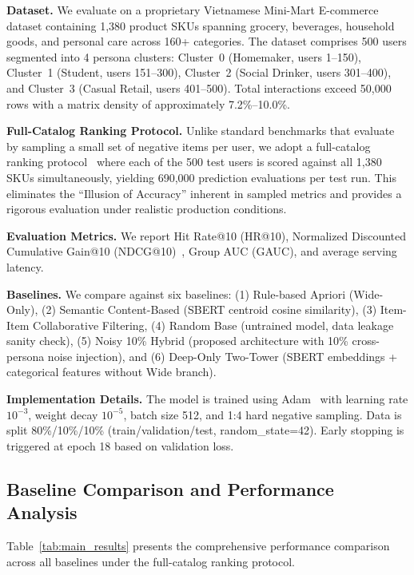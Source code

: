 \documentclass[10pt,conference]{IEEEtran}
\begin{document}
\textbf{Dataset.} We evaluate on a proprietary Vietnamese Mini-Mart E-commerce dataset containing 1,380 product SKUs spanning grocery, beverages, household goods, and personal care across 160+ categories. The dataset comprises 500 users segmented into 4 persona clusters: Cluster~0 (Homemaker, users 1--150), Cluster~1 (Student, users 151--300), Cluster~2 (Social Drinker, users 301--400), and Cluster~3 (Casual Retail, users 401--500). Total interactions exceed 50,000 rows with a matrix density of approximately 7.2\%--10.0\%.

\textbf{Full-Catalog Ranking Protocol.} Unlike standard benchmarks that evaluate by sampling a small set of negative items per user, we adopt a full-catalog ranking protocol~\cite{krichene2022sampled} where each of the 500 test users is scored against all 1,380 SKUs simultaneously, yielding 690,000 prediction evaluations per test run. This eliminates the ``Illusion of Accuracy'' inherent in sampled metrics and provides a rigorous evaluation under realistic production conditions.

\textbf{Evaluation Metrics.} We report Hit Rate@10 (HR@10), Normalized Discounted Cumulative Gain@10 (NDCG@10)~\cite{jarvelin2002cumulated}, Group AUC (GAUC), and average serving latency.

\textbf{Baselines.} We compare against six baselines: (1) Rule-based Apriori (Wide-Only), (2) Semantic Content-Based (SBERT centroid cosine similarity), (3) Item-Item Collaborative Filtering, (4) Random Base (untrained model, data leakage sanity check), (5) Noisy 10\% Hybrid (proposed architecture with 10\% cross-persona noise injection), and (6) Deep-Only Two-Tower (SBERT embeddings + categorical features without Wide branch).

\textbf{Implementation Details.} The model is trained using Adam~\cite{kingma2015adam} with learning rate $10^{-3}$, weight decay $10^{-5}$, batch size 512, and 1:4 hard negative sampling. Data is split 80\%/10\%/10\% (train/validation/test, random\_state=42). Early stopping is triggered at epoch 18 based on validation loss.

\subsection{Baseline Comparison and Performance Analysis}
\label{subsec:baseline_comparison}

Table~\ref{tab:main_results} presents the comprehensive performance comparison across all baselines under the full-catalog ranking protocol.
\end{document}
